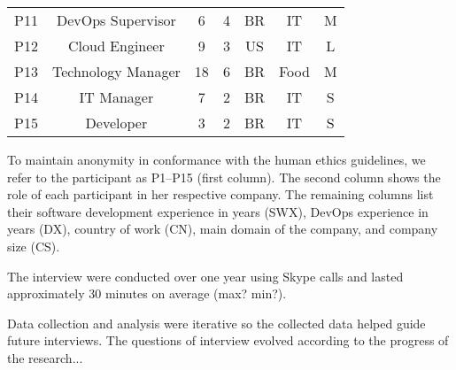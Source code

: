 \begin{table}[t]
\begin{tabular}{ccccccc}
P11                  & DevOps Supervisor                & 6            & 4           & BR            & IT                  & M                               \\

P12                  & Cloud Engineer              & 9            & 3           & US            & IT                  & L                               \\

P13                  & Technology Manager                 & 18            & 6           & BR            & Food                  & M                               \\

P14                  & IT Manager            & 7            & 2           & BR            & IT                  & S                               \\

P15                  & Developer        & 3            & 2           & BR            & IT                  & S
\end{tabular}
\end{table}


To maintain anonymity in conformance with the human ethics guidelines,
we refer to the participant as P1--P15 (first column).
The second column shows the role of
each participant in her respective company. The remaining columns list their
software development experience in years (SWX), DevOps experience in years (DX),
country of work (CN), main domain of the company, and company size (CS).

The interview were conducted over one year using Skype calls and lasted
approximately 30 minutes on average (max? min?).

Data collection and analysis were iterative so the collected data helped guide
future interviews. The questions of interview evolved according to the progress
of the research...

